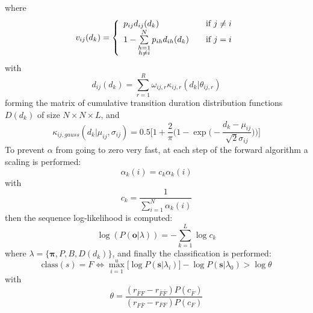 \documentclass[12pt]{article} %
\begin{document}
where
\begin{equation}
    v_{ij}(d_k) = \left\{
        \begin{array}{l l}
            p_{ij} d_{ij}(d_k)
                & \quad \text{if $j \neq i$}\\
            1 - \sum\limits_{\substack{h=1 \\ h \neq i}}^{N} p_{ih} d_{ih}(d_k)
                & \quad \text{if $j = i$}
        \end{array} \right.
\end{equation}
with
\begin{equation}
    d_{ij}(d_k) = \sum_{r=1}^{R} \omega_{ij,r}\kappa_{ij,r}(d_k|\theta_{ij, r})
\end{equation}
forming the matrix of cumulative transition duration distribution functions
$ D(d_k) $ of size $ N \times N \times L $, and
\begin{equation}
    \kappa_{ij, gauss}(d_k | \mu_{ij}, \sigma_{ij}) = 
        0.5\bigg [1 + \frac{2}{\pi}\Big (
            1 - \exp \big (-\frac{d_k - \mu_{ij}}{\sqrt 2 \sigma_{ij}}\big )
        \Big ) \bigg ]
\end{equation}
To prevent $ \alpha $ from going to zero very fast, at each step of the forward
algorithm a scaling is performed:
\begin{equation}
    \alpha_k(i) = c_k \alpha_k(i)
\end{equation}
with
\begin{equation}
    c_k = \frac{1}{\sum\limits_{i=1}^{N} \alpha_k(i)}
\end{equation}
then the sequence log-likelihood is computed:
\begin{equation}
    \log(P(\boldsymbol{o}|\lambda)) = -\sum\limits_{k=1}^{L} \log c_k
\end{equation}
where $ \lambda = \{\boldsymbol{\pi}, P, B, D(d_k) \} $,  and finally the
classification is performed:
\begin{equation}
    \text{class}(s) = F \iff \max_{i=1}^{u} \big [
        \log P(\boldsymbol{s}|\lambda_i)
    \big ] - \log P(\boldsymbol{s}|\lambda_0) > \log \theta
\end{equation}
with
\begin{equation}
    \theta = \frac{(r_{\bar{F}F} - r_{\bar{F}\bar{F}})P(c_{\bar{F}})}
        {(r_{F \bar{F}} - r_{FF})P(c_{F})}
\end{equation}
\end{document}

